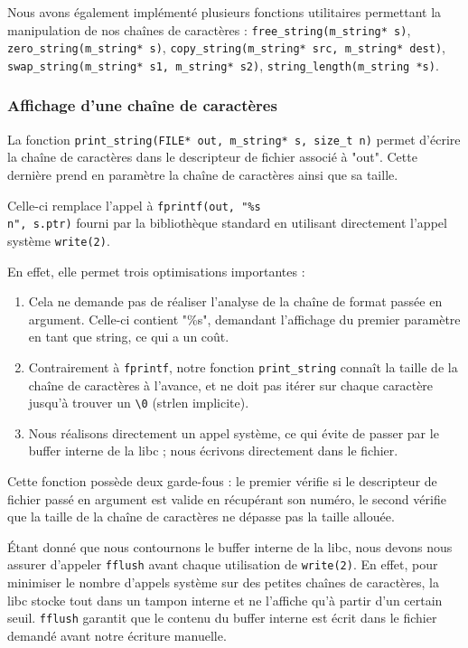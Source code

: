 \documentclass[a4paper,11pt]{article}
\begin{document}
Nous avons également implémenté plusieurs fonctions utilitaires permettant la manipulation de nos chaînes de caractères : \texttt{free\_string(m\_string* s)}, \texttt{zero\_string(m\_string* s)}, \texttt{copy\_string(m\_string* src, m\_string* dest)}, \texttt{swap\_string(m\_string* s1, m\_string* s2)}, \texttt{string\_length(m\_string *s)}.

\subsubsection{Affichage d'une chaîne de caractères}

La fonction \texttt{print\_string(FILE* out, m\_string* s, size\_t n)} permet d'écrire la chaîne de caractères dans le descripteur de fichier associé à "out". Cette dernière prend en paramètre la chaîne de caractères ainsi que sa taille.

Celle-ci remplace l'appel à \texttt{fprintf(out, "\%s\\n", s.ptr)} fourni par la bibliothèque standard en utilisant directement l'appel système \texttt{write(2)}.

En effet, elle permet trois optimisations importantes :

\begin{enumerate}
    \item Cela ne demande pas de réaliser l'analyse de la chaîne de format passée en argument. Celle-ci contient "\%s", demandant l'affichage du premier paramètre en tant que string, ce qui a un coût.
    \item Contrairement à \texttt{fprintf}, notre fonction \texttt{print\_string} connaît la taille de la chaîne de caractères à l'avance, et ne doit pas itérer sur chaque caractère jusqu'à trouver un \texttt{\textbackslash 0} (strlen implicite).
    \item Nous réalisons directement un appel système, ce qui évite de passer par le buffer interne de la libc ; nous écrivons directement dans le fichier.
\end{enumerate}

Cette fonction possède deux garde-fous : le premier vérifie si le descripteur de fichier passé en argument est valide en récupérant son numéro, le second vérifie que la taille de la chaîne de caractères ne dépasse pas la taille allouée.

Étant donné que nous contournons le buffer interne de la libc, nous devons nous assurer d'appeler \texttt{fflush} avant chaque utilisation de \texttt{write(2)}. En effet, pour minimiser le nombre d'appels système sur des petites chaînes de caractères, la libc stocke tout dans un tampon interne et ne l'affiche qu'à partir d'un certain seuil. \texttt{fflush} garantit que le contenu du buffer interne est écrit dans le fichier demandé avant notre écriture manuelle.
\end{document}
